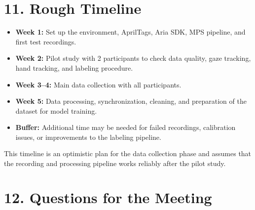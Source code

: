 \documentclass[11pt,a4paper]{article}
\begin{document}
\section*{11. Rough Timeline}

\begin{itemize}
    \item \textbf{Week 1:} Set up the environment, AprilTags, Aria SDK, MPS pipeline, and first test recordings.
    
    \item \textbf{Week 2:} Pilot study with 2 participants to check data quality, gaze tracking, hand tracking, and labeling procedure.
    
    \item \textbf{Week 3--4:} Main data collection with all participants.
    
    \item \textbf{Week 5:} Data processing, synchronization, cleaning, and preparation of the dataset for model training.
    
    \item \textbf{Buffer:} Additional time may be needed for failed recordings, calibration issues, or improvements to the labeling pipeline.
\end{itemize}

This timeline is an optimistic plan for the data collection phase and assumes that the recording and processing pipeline works reliably after the pilot study.

\section*{12. Questions for the Meeting}
\end{document}
